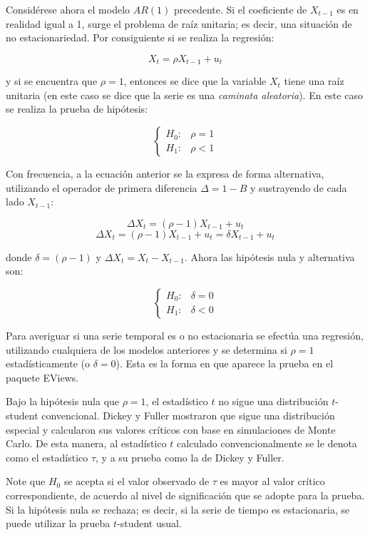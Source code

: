 Consid\'{e}rese ahora el modelo $AR(1)$ precedente. Si el coeficiente de $X_{t-1}$ es en realidad igual a 1, surge el problema de ra\'{i}z unitaria; es decir, una situaci\'{o}n de no estacionariedad. Por consiguiente si se realiza la regresi\'{o}n:

\[
X_{t}=\rho X_{t-1}+u_{t}
\]

y si se encuentra que $\rho =1$, entonces se dice que la variable $X_{t}$ tiene una ra\'{i}z unitaria (en este caso se dice que la serie es una \emph{caminata aleatoria}). En este caso se realiza la prueba de hip\'{o}tesis:

\[
\begin{cases}
H_{0}:&\rho =1 \\ 
H_{1}:&\rho <1
\end{cases}
\]

Con frecuencia, a la ecuaci\'{o}n anterior se la expresa de forma alternativa, utilizando el operador de primera diferencia $\Delta =1-B$ y sustrayendo de cada lado $X_{t-1}$:

\[
{\Delta }X_{t}=\left( \rho -1 \right)X_{t-1}+u_{t}
\]
\[
{\Delta }X_{t}=\left( \rho -1 \right)X_{t-1}+u_{t}=\delta 
X_{t-1}+u_{t}
\]

donde $\delta =(\rho -1)$ y ${\Delta }X_{t}=X_{t}-X_{t-1}$. Ahora las hip\'{o}tesis nula y alternativa son: 

\[
\begin{cases}
 H_{0}:&\delta =0 \\ 
 H_{1}:&\delta <0 
\end{cases}
\]

Para averiguar si una serie temporal es o no estacionaria se efect\'{u}a una regresi\'{o}n, utilizando cualquiera de los modelos anteriores y se determina si $\rho =1$ estad\'{i}sticamente (o  $\delta =0$). Esta es la forma en que aparece la prueba en el paquete EViews.\newline

Bajo la hip\'{o}tesis nula que $\rho =1$, el estad\'{i}stico $t$ no sigue una distribuci\'{o}n $t$-student convencional. Dickey y Fuller mostraron que sigue una distribuci\'{o}n especial y calcularon sus valores cr\'{i}ticos con base en simulaciones de Monte Carlo. De esta manera, al estad\'{i}stico $t$ calculado convencionalmente se le denota como el estad\'{i}stico $\tau $, y a su prueba como la de Dickey y Fuller.\newline

Note que $H_{0}$ se acepta si el valor observado de $\tau $ es mayor al valor cr\'{i}tico correspondiente, de acuerdo al nivel de significaci\'{o}n que se adopte para la prueba. Si la hip\'{o}tesis nula se rechaza; es decir, si la serie de tiempo es estacionaria, se puede utilizar la prueba $t$-student usual.\newline

